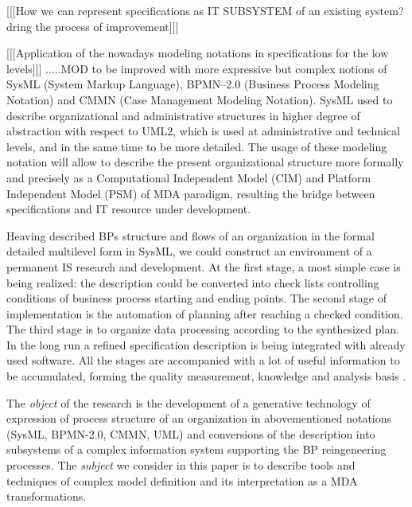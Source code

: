 \documentclass[conference]{IEEEtran}
\begin{document}
[[[How we can represent specifications as IT SUBSYSTEM of an existing system? dring the process of improvement]]]

[[[Application of the nowadays modeling notations in specifications for the low levels]]]
.....MOD to be improved with more expressive but complex notions of SysML (System Markup Language), BPMN--2.0 (Business Process Modeling Notation) and CMMN (Case Management Modeling Notation).  SysML used to describe organizational and administrative structures in higher degree of abstraction with respect to UML2, which is used at administrative and technical levels, and in the same time to be more detailed.  The usage of these modeling notation will allow to describe the present organizational structure more formally and precisely as a Computational Independent Model (CIM) and Platform Independent Model (PSM) of MDA paradigm, resulting the bridge between specifications and IT resource under development.

Heaving described BPs structure and flows of an organization in the formal detailed multilevel form in SysML, we could construct an environment of a permanent IS research and development.  At the first stage, a most simple case is being realized: the description could be converted into check lists controlling conditions of business process starting and ending points. The second stage of implementation is the automation of planning after reaching a checked condition.  The third stage is to organize data processing according to the synthesized plan.  In the long run a refined specification description is being integrated with already used software.  All the stages are accompanied with a lot of useful information to be accumulated, forming the quality measurement, knowledge and analysis basis \cite{aiowa}.


The \emph{object} of the research is the development of a generative technology \cite{} of expression of process structure of an organization in abovementioned notations (SysML, BPMN-2.0, CMMN, UML) and conversions of the description into subsystems of a complex information system supporting the BP reingeneering processes. The \emph{subject} we consider in this paper is to describe tools and techniques of complex model definition and its interpretation as a MDA transformations.
\end{document}
